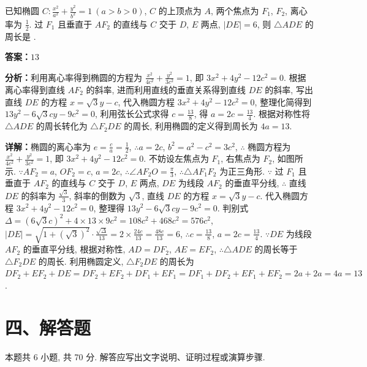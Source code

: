 \begin{question}[points=5]
已知椭圆 $C: \frac{x^2}{a^2} + \frac{y^2}{b^2} = 1\ (a > b > 0)$, $C$ 的上顶点为 $A$, 两个焦点为 $F_1$, $F_2$, 离心率为 $\frac{1}{2}$. 过 $F_1$ 且垂直于 $AF_2$ 的直线与 $C$ 交于 $D$, $E$ 两点, $|DE| = 6$, 则 $\triangle ADE$ 的周长是 .
\fillin[{$13$}]
\begin{solution}
\textbf{答案：}$13$

\textbf{分析：}利用离心率得到椭圆的方程为 $\frac{x^2}{4c^2} + \frac{y^2}{3c^2} = 1$, 即 $3x^2 + 4y^2 - 12c^2 = 0$. 根据离心率得到直线 $AF_2$ 的斜率, 进而利用直线的垂直关系得到直线 $DE$ 的斜率, 写出直线 $DE$ 的方程 $x = \sqrt{3}y - c$, 代入椭圆方程 $3x^2 + 4y^2 - 12c^2 = 0$, 整理化简得到 $13y^2 - 6\sqrt{3}cy - 9c^2 = 0$, 利用弦长公式求得 $c = \frac{13}{8}$, 得 $a = 2c = \frac{13}{4}$. 根据对称性将 $\triangle ADE$ 的周长转化为 $\triangle F_2DE$ 的周长, 利用椭圆的定义得到周长为 $4a = 13$.

\textbf{详解：}椭圆的离心率为 $e = \frac{c}{a} = \frac{1}{2}$, $\therefore a = 2c$, $b^2 = a^2 - c^2 = 3c^2$, $\therefore$ 椭圆方程为 $\frac{x^2}{4c^2} + \frac{y^2}{3c^2} = 1$, 即 $3x^2 + 4y^2 - 12c^2 = 0$. 不妨设左焦点为 $F_1$, 右焦点为 $F_2$, 如图所示. $\because AF_2 = a$, $OF_2 = c$, $a = 2c$, $\therefore \angle AF_2O = \frac{\pi}{3}$, $\therefore \triangle AF_1F_2$ 为正三角形. $\because$ 过 $F_1$ 且垂直于 $AF_2$ 的直线与 $C$ 交于 $D$, $E$ 两点, $DE$ 为线段 $AF_2$ 的垂直平分线, $\therefore$ 直线 $DE$ 的斜率为 $\frac{\sqrt{3}}{3}$, 斜率的倒数为 $\sqrt{3}$, 直线 $DE$ 的方程 $x = \sqrt{3}y - c$. 代入椭圆方程 $3x^2 + 4y^2 - 12c^2 = 0$, 整理得 $13y^2 - 6\sqrt{3}cy - 9c^2 = 0$. 判别式 $\Delta = (6\sqrt{3}c)^2 + 4 \times 13 \times 9c^2 = 108c^2 + 468c^2 = 576c^2$, $|DE| = \sqrt{1 + (\sqrt{3})^2} \cdot \frac{\sqrt{\Delta}}{13} = 2 \times \frac{24c}{13} = \frac{48c}{13} = 6$, $\therefore c = \frac{13}{8}$, $a = 2c = \frac{13}{4}$. $\because DE$ 为线段 $AF_2$ 的垂直平分线, 根据对称性, $AD = DF_2$, $AE = EF_2$, $\therefore \triangle ADE$ 的周长等于 $\triangle F_2DE$ 的周长. 利用椭圆定义, $\triangle F_2DE$ 的周长为 $DF_2 + EF_2 + DE = DF_2 + EF_2 + DF_1 + EF_1 = DF_1 + DF_2 + EF_1 + EF_2 = 2a + 2a = 4a = 13$.
\end{solution}
\end{question}

\section*{四、解答题}
本题共 6 小题, 共 70 分. 解答应写出文字说明、证明过程或演算步骤.

